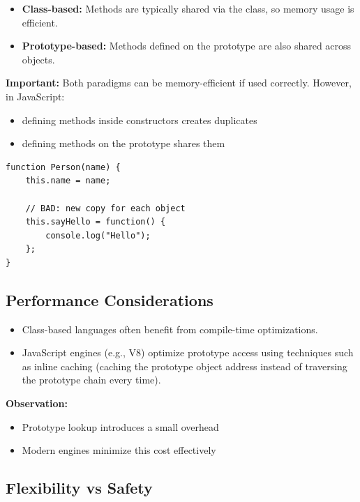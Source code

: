 \documentclass{scrbook}
\begin{document}
\begin{itemize}
    \item \textbf{Class-based:} Methods are typically shared via the class, so memory usage is efficient.
    \item \textbf{Prototype-based:} Methods defined on the prototype are also shared across objects.
\end{itemize}

\textbf{Important:}  
Both paradigms can be memory-efficient if used correctly. However, in JavaScript:

\begin{itemize}
    \item defining methods inside constructors creates duplicates
    \item defining methods on the prototype shares them
\end{itemize}

\begin{lstlisting}
function Person(name) {
    this.name = name;

    // BAD: new copy for each object
    this.sayHello = function() {
        console.log("Hello");
    };
}
\end{lstlisting}

\subsection{Performance Considerations}

\begin{itemize}
    \item Class-based languages often benefit from compile-time optimizations.
    \item JavaScript engines (e.g., V8) optimize prototype access using techniques such as inline caching (caching the prototype object address instead of traversing the prototype chain every time).
\end{itemize}

\textbf{Observation:}
\begin{itemize}
    \item Prototype lookup introduces a small overhead
    \item Modern engines minimize this cost effectively
\end{itemize}

\subsection{Flexibility vs Safety}
\end{document}
